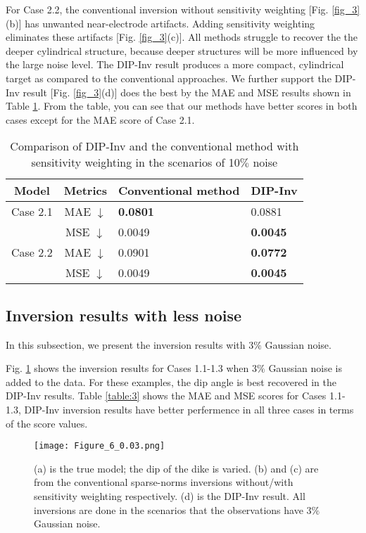 \documentclass{article}
\begin{document}
For Case 2.2, the conventional inversion without sensitivity weighting [Fig. \ref{fig_3}(b)] has unwanted near-electrode artifacts. Adding sensitivity weighting eliminates these artifacts [Fig. \ref{fig_3}(c)]. All methods struggle to recover the the deeper cylindrical structure, because deeper structures will be more influenced by the large noise level. The DIP-Inv result produces a more compact, cylindrical target as compared to the conventional approaches. We further support the DIP-Inv result [Fig. \ref{fig_3}(d)] does the best by the MAE and MSE results shown in Table \ref{table:2}. From the table, you can see that our methods have better scores in both cases except for the MAE score of Case 2.1.

\begin{table}[h!]
\centering
\caption{Comparison of DIP-Inv and the conventional method with sensitivity weighting in the scenarios of 10$\%$ noise}
\begin{tabular}{|c|c|l|l|}
\hline
Model & Metrics & Conventional method& DIP-Inv\\
\hline
Case 2.1 & MAE $\downarrow$ & \textbf{0.0801} & 0.0881\\
 & MSE $\downarrow$ & 0.0049 & \textbf{0.0045}\\
\hline
Case 2.2 & MAE $\downarrow$ & 0.0901 & \textbf{0.0772}\\
 & MSE $\downarrow$ & 0.0049 & \textbf{0.0045}\\
\hline
\end{tabular}
\label{table:2}
\end{table}
\pagebreak
\subsection{Inversion results with less noise}
In this subsection, we present the inversion results with $3\%$ Gaussian noise. 

Fig. \ref{fig_4} shows the inversion results for Cases 1.1-1.3 when $3\%$ Gaussian noise is added to the data. For these examples, the dip angle is best recovered in the DIP-Inv results. Table \ref{table:3} shows the MAE and MSE scores for Cases 1.1-1.3, DIP-Inv inversion results have better perfermence in all three cases in terms of the score values. 

\begin{figure}[h!]
\centering
\texttt{[image: Figure\_6\_0.03.png]}
\caption{(a) is the true model; the dip of the dike is varied. (b) and (c) are from the conventional sparse-norms inversions without/with sensitivity weighting respectively. (d) is the DIP-Inv result. All inversions are done in the scenarios that the observations have 3$\%$ Gaussian noise.}
\label{fig_4}
\end{figure}
\end{document}
